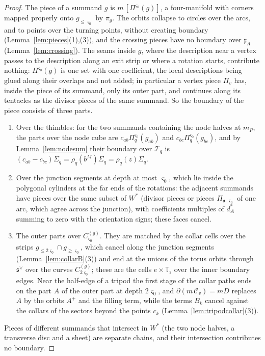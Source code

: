 \begin{proof}
The piece of a summand $g$ is $m\,[\Pi^{\varsigma_0}(g)]$, a four-manifold with corners mapped properly onto $g_{\le\varsigma_0}$ by $\pi_g$. The orbits collapse to circles over the arcs, and to points over the turning points, without
creating boundary (Lemma~\ref{lem:pieces}(1),(3)), and the crossing pieces have no boundary over $\mathfrak x_A$
(Lemma~\ref{lem:crossing}). The seams inside $g$, where the description near a vertex passes to the description along an
exit strip or where a rotation starts, contribute nothing: $\Pi^{\varsigma_0}(g)$ is one set with one coefficient, the local
descriptions being glued along their overlaps and not added; in particular a vertex piece $\Pi_v$ has, inside the piece
of its summand, only its outer part, and continues along its tentacles as the divisor pieces of the same summand.
So the boundary of the piece consists of three parts.
\begin{enumerate}
\item[(a)] Over the thimbles: for the two summands containing the node halves at $m_P$, the parts over the node cube are
$c_{ab}\Pi^{\varsigma_0}_q(g_{ab})$ and $c_{bc}\Pi^{\varsigma_0}_q(g_{bc})$, and by Lemma~\ref{lem:nodesum} their boundary over
$\mathscr T_q$ is $(c_{ab}-c_{bc})\Sigma_q=\rho_q(b^M)\Sigma_q=\rho_q(z)\Sigma_q$.
\item[(b)] Over the junction segments at depth at most $\varsigma_0$, which lie inside the polygonal cylinders at the far ends
of the rotations: the adjacent summands have pieces over the same subset of $W^*$ (divisor
pieces or pieces $\Pi_{\mathfrak a,\varsigma_0}$ of one arc, which agree across the junction), with coefficients multiples of
$d^*_A$ summing to zero with the orientation signs; these faces cancel.
\item[(c)] The outer parts over $C^{(g)}_{\varsigma_0}$. They are matched by the collar cells over the strips
$g_{\le2\varsigma_0}\cap g_{\ge\varsigma_0}$, which cancel along the junction segments (Lemma~\ref{lem:collarB}(3)) and end at
the unions of the torus orbits through $\mathfrak s^\vee$ over the curves $C^{(g)}_{2\varsigma_0}$; these are the cells
$e\times\mathbb T_{\mathsf s}$ over the inner boundary edges. Near the half-edge of a tripod the first stage of the collar
paths ends on the part $A$ of the outer part at depth $2\varsigma_0$, and $\partial(m\,\mathscr C_v)=m D$ replaces $A$ by the
orbits $A^+$ and the filling term, while the terms $B_k$ cancel against the collars of the sectors beyond the points $c_k$
(Lemma~\ref{lem:tripodcollar}(3)).
\end{enumerate}
Pieces of different summands that intersect in $W^*$ (the two node halves, a transverse disc and a sheet) are separate
chains, and their intersection contributes no boundary.


\end{proof}
